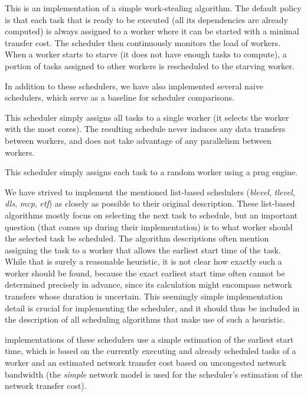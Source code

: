 \begin{description}[wide=0pt,itemsep=0pt,topsep=4pt]
	\item[ws]
		This is an implementation of a simple work-stealing algorithm. The default policy is that each task
		that is ready to be executed (all its dependencies are already computed) is always assigned to a
		worker where it can be started with a minimal transfer cost. The scheduler then continuously
		monitors the load of workers. When a worker starts to starve (it does not have enough tasks to
		compute), a portion of tasks assigned to other workers is rescheduled to the starving worker.
\end{description}

In addition to these schedulers, we have also implemented several naive schedulers, which serve as
a baseline for scheduler comparisons.

\begin{description}[wide=0pt]
	\item[single]
		This scheduler simply assigns all tasks to a single worker (it selects the worker with the most
		cores). The resulting schedule never induces any data transfers between workers, and does not take
		advantage of any parallelism between workers.
	\item[random]
		This scheduler simply assigns each task to a random worker using a \gls{prng} engine.
\end{description}

We have strived to implement the mentioned list-based schedulers (\emph{blevel},
\emph{tlevel}, \emph{dls}, \emph{mcp}, \emph{etf})
as closely as possible to their original description. These list-based algorithms mostly focus on
selecting the next task to schedule, but an important question (that comes up during their
implementation) is to what worker should the selected task be scheduled. The algorithm descriptions
often mention assigning the task to a worker that allows the earliest start time of the task. While
that is surely a reasonable heuristic, it is not clear how exactly such a worker should be found,
because the exact earliest start time often cannot be determined precisely in advance, since its
calculation might encompass network transfers whose duration is uncertain. This seemingly simple
implementation detail is crucial for implementing the scheduler, and it should thus be included in
the description of all scheduling algorithms that make use of such a heuristic.

\estee{} implementations of these schedulers use a simple estimation of the earliest
start time, which is based on the currently executing and already scheduled tasks of a worker and
an estimated network transfer cost based on uncongested network bandwidth (the
\emph{simple} network model is used for the scheduler's estimation of the network
transfer cost).

